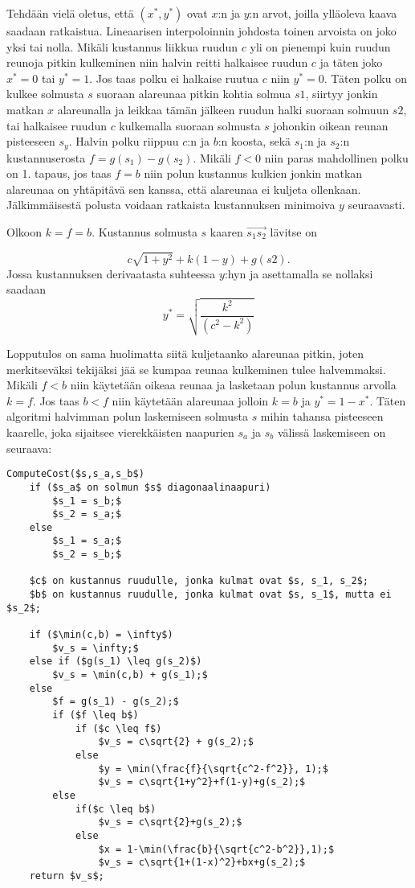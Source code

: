 \documentclass[finnish]{tktltiki2}
\theoremstyle{definition}
\theoremstyle{remark}
\begin{document}
Tehdään vielä oletus, että \((x^*, y^*)\) ovat \(x\):n ja \(y\):n arvot, joilla ylläoleva kaava saadaan ratkaistua. Lineaarisen interpoloinnin johdosta toinen arvoista on joko yksi tai nolla. Mikäli kustannus liikkua ruudun \(c\) yli on pienempi kuin ruudun reunoja pitkin kulkeminen niin halvin reitti halkaisee ruudun \(c\) ja täten joko \(x^* = 0\) tai \(y^* = 1\). Jos taas polku ei halkaise ruutua \(c\) niin \(y^* = 0\). Täten polku on kulkee solmusta \(s\) suoraan alareunaa pitkin kohtia solmua \(s1\), siirtyy jonkin matkan \(x\) alareunalla ja leikkaa tämän jälkeen ruudun halki suoraan solmuun \(s2\), tai halkaisee ruudun \(c\) kulkemalla suoraan solmusta \(s\) johonkin oikean reunan pisteeseen \(s_y\). Halvin polku riippuu \(c\):n ja \(b\):n koosta, sekä \(s_1\):n ja \(s_2\):n kustannuserosta \(f = g(s_1) - g(s_2)\). Mikäli \(f < 0\) niin paras mahdollinen polku on 1. tapaus, jos taas \(f = b\) niin polun kustannus kulkien jonkin matkan alareunaa on yhtäpitävä sen kanssa, että alareunaa ei kuljeta ollenkaan. Jälkimmäisestä polusta voidaan ratkaista kustannuksen minimoiva \(y\) seuraavasti.

Olkoon $k = f = b$. Kustannus solmusta $s$ kaaren $\overrightarrow{s_1s_2}$ lävitse on

\[c\sqrt{1+y^2}+k(1-y)+g(s2).\]
Jossa kustannuksen derivaatasta suhteessa \(y\):hyn ja asettamalla se nollaksi saadaan
\[y^* = \sqrt{\frac{k^2}{(c^2-k^2)}}\]

Lopputulos on sama huolimatta siitä kuljetaanko alareunaa pitkin, joten merkitseväksi tekijäksi jää se kumpaa reunaa kulkeminen tulee halvemmaksi. Mikäli \(f < b\) niin käytetään oikeaa reunaa ja lasketaan polun kustannus arvolla \(k = f\). Jos taas \(b < f\) niin käytetään alareunaa jolloin \(k = b\) ja \(y^* = 1 - x^*\). Täten algoritmi halvimman polun laskemiseen solmusta \(s\) mihin tahansa pisteeseen kaarelle, joka sijaitsee vierekkäisten naapurien \(s_a\) ja \(s_b\) välissä laskemiseen on seuraava:

\lstset{basicstyle=\tiny, tabsize=4}
\begin{lstlisting}[mathescape=true]
ComputeCost($s,s_a,s_b$)
	if ($s_a$ on solmun $s$ diagonaalinaapuri)
		$s_1 = s_b;$
		$s_2 = s_a;$
	else
		$s_1 = s_a;$
		$s_2 = s_b;$

	$c$ on kustannus ruudulle, jonka kulmat ovat $s, s_1, s_2$;
	$b$ on kustannus ruudulle, jonka kulmat ovat $s, s_1$, mutta ei $s_2$;

	if ($\min(c,b) = \infty$)
		$v_s = \infty;$
	else if ($g(s_1) \leq g(s_2)$)
		$v_s = \min(c,b) + g(s_1);$
	else
		$f = g(s_1) - g(s_2);$
		if ($f \leq b$)
			if ($c \leq f$)
				$v_s = c\sqrt{2} + g(s_2);$
			else
				$y = \min(\frac{f}{\sqrt{c^2-f^2}}, 1);$
				$v_s = c\sqrt{1+y^2}+f(1-y)+g(s_2);$
		else
			if($c \leq b$)
				$v_s = c\sqrt{2}+g(s_2);$
			else
				$x = 1-\min(\frac{b}{\sqrt{c^2-b^2}},1);$
				$v_s = c\sqrt{1+(1-x)^2}+bx+g(s_2);$
	return $v_s$;
\end{lstlisting}
\end{document}
